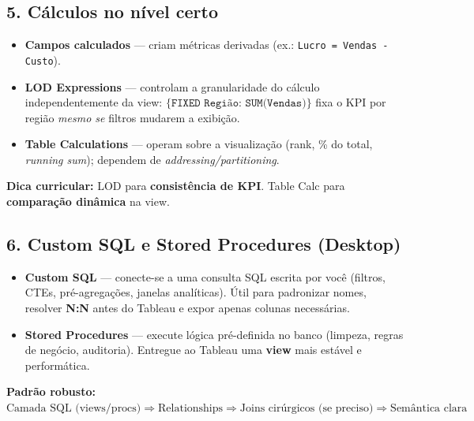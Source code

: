 \subsection*{5. Cálculos no nível certo}
\begin{itemize}[leftmargin=*]
  \item \textbf{Campos calculados} — criam métricas derivadas (ex.: \texttt{Lucro = Vendas - Custo}).
  \item \textbf{LOD Expressions} — controlam a granularidade do cálculo independentemente da view:  
  \(\{\texttt{FIXED Região: SUM(Vendas)}\}\) fixa o KPI por região \emph{mesmo se} filtros mudarem a exibição.
  \item \textbf{Table Calculations} — operam sobre a visualização (rank, \% do total, \textit{running sum}); dependem de \textit{addressing/partitioning}.
\end{itemize}

\begin{NoteBox}
\textbf{Dica curricular:} LOD para \textbf{consistência de KPI}. Table Calc para \textbf{comparação dinâmica} na view.
\end{NoteBox}

\subsection*{6. Custom SQL e Stored Procedures (Desktop)}
\begin{itemize}[leftmargin=*]
  \item \textbf{Custom SQL} — conecte-se a uma consulta SQL escrita por você (filtros, CTEs, pré-agregações, janelas analíticas).  
  Útil para padronizar nomes, resolver \textbf{N:N} antes do Tableau e expor apenas colunas necessárias.
  \item \textbf{Stored Procedures} — execute lógica pré-definida no banco (limpeza, regras de negócio, auditoria).  
  Entregue ao Tableau uma \textbf{view} mais estável e performática.
\end{itemize}

\begin{FormulaBox}
\textbf{Padrão robusto:}\\[3pt]
\(\text{Camada SQL (views/procs)} \Rightarrow \text{Relationships} \Rightarrow \text{Joins cirúrgicos (se preciso)} \Rightarrow \text{Semântica clara}\)
\end{FormulaBox}

